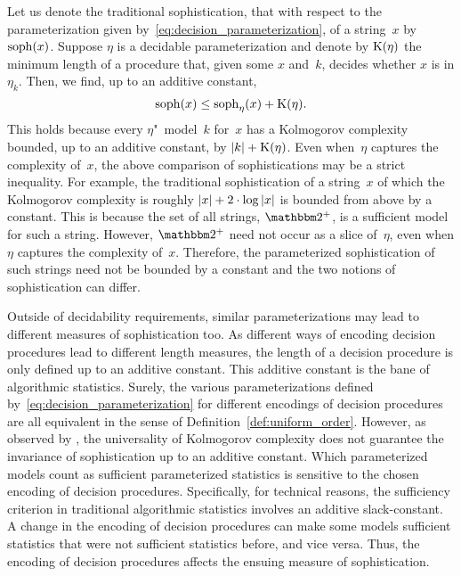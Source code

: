 %
Let us denote the traditional sophistication, that with respect to the parameterization given by~\eqref{eq:decision_parameterization}, of a string~$x$ by $\operatorname{soph}(x)$.
Suppose $\eta$ is a decidable parameterization and denote by $\operatorname{K}(\eta)$ the minimum length of a procedure that, given some $x$ and~$k$, decides whether $x$ is in $\eta_k$.
Then, we find, up to an additive constant,
\begin{equation}
\label{eq:soph}
  \operatorname{soph}(x) \le \operatorname{soph}_\eta(x) + \operatorname{K}(\eta).
\end{equation}
This holds because every $\eta$"~model~$k$ for~$x$ has a Kolmogorov complexity bounded, up to an additive constant, by ${\lvert k\rvert} + \operatorname{K}(\eta)$.
Even when~$\eta$ captures the complexity of~$x$, the above comparison of sophistications may be a strict inequality.
For example, the traditional sophistication of a string~$x$ of which the Kolmogorov complexity is roughly ${\lvert x\rvert} + 2 \cdot \log {\lvert x\rvert}$ is bounded from above by a constant.
This is because the set of all strings, $\binary^+$, is a sufficient model for such a string.
However, $\binary^+$ need not occur as a slice of~$\eta$, even when $\eta$ captures the complexity of~$x$.
Therefore, the parameterized sophistication of such strings need not be bounded by a constant and the two notions of sophistication can differ.

Outside of decidability requirements, similar parameterizations may lead to different measures of sophistication too.
As different ways of encoding decision procedures lead to different length measures, the length of a decision procedure is only defined up to an additive constant.
This additive constant is the bane of algorithmic statistics.
Surely, the various parameterizations defined by~\eqref{eq:decision_parameterization} for different encodings of decision procedures are all equivalent in the sense of Definition~\ref{def:uniform_order}.
However, as observed by \textcite{vereshchagin2009algorithmic,bloem2015two}, the universality of Kolmogorov complexity does not guarantee the invariance of sophistication up to an additive constant.
Which parameterized models count as sufficient parameterized statistics is sensitive to the chosen encoding of decision procedures.
Specifically, for technical reasons, the sufficiency criterion in traditional algorithmic statistics involves an additive slack-constant.
A change in the encoding of decision procedures can make some models sufficient statistics that were not sufficient statistics before, and vice versa.
Thus, the encoding of decision procedures affects the ensuing measure of sophistication.


